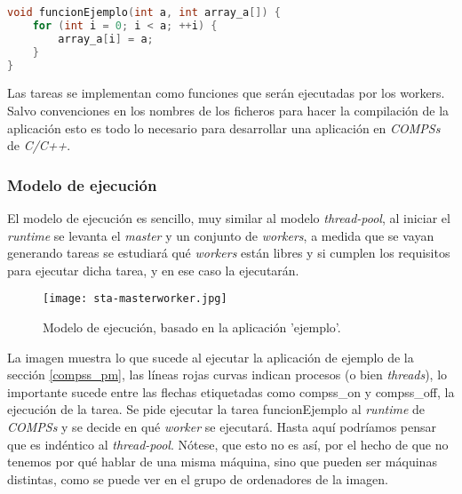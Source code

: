 \begin{lstlisting}[caption={Implementación de la función 'funcionEjemplo'}, captionpos=b, label={lst:ejemplo-functions.cc}, language=C++]
void funcionEjemplo(int a, int array_a[]) {
    for (int i = 0; i < a; ++i) {
        array_a[i] = a;
    }
}
\end{lstlisting}

Las tareas se implementan como funciones que serán ejecutadas por los workers. Salvo convenciones en los nombres de los ficheros para hacer la compilación de la aplicación esto es todo lo necesario para desarrollar una aplicación en \textit{COMPSs} de \textit{C/C++}.

\begin{comment}
\subsubsection{Compilación}

Para compilar la aplicacion en \textit{COMPSs} de \textit{C/C++}, 

\begin{figure}[H]
    \centering
    \caption{Proceso de compilado de una aplicación COMPSs C/C++}
    \texttt{[image: proceso\_compilado.jpg]}
    \label{fig:proceso_compilado}
\end{figure}
\end{comment}

\subsubsection{Modelo de ejecución\label{modeloejecucion}}

El modelo de ejecución es sencillo, muy similar al modelo \textit{thread-pool}, al iniciar el \textit{runtime} se levanta el \textit{master} y un conjunto de \textit{workers}, a medida que se vayan generando tareas se estudiará qué \textit{workers} están libres y si cumplen los requisitos para ejecutar dicha tarea, y en ese caso la ejecutarán. 

\begin{figure}[H]
    \centering 
    \caption{Modelo de ejecución, basado en la aplicación 'ejemplo'.}
    \texttt{[image: sta-masterworker.jpg]}
    \label{fig:masterworker_pool}
\end{figure}

La imagen muestra lo que sucede al ejecutar la aplicación de ejemplo de la sección \ref{compss_pm}, las líneas rojas curvas indican procesos (o bien \textit{threads}), lo importante sucede entre las flechas etiquetadas como compss\_on y compss\_off, la ejecución de la tarea. Se pide ejecutar la tarea funcionEjemplo al \textit{runtime} de \textit{COMPSs} y se decide en qué \textit{worker} se ejecutará. Hasta aquí podríamos pensar que es indéntico al \textit{thread-pool}. Nótese, que esto no es así, por el hecho de que no tenemos por qué hablar de una misma máquina, sino que pueden ser máquinas distintas, como se puede ver en el grupo de ordenadores de la imagen. 
\par\bigskip

